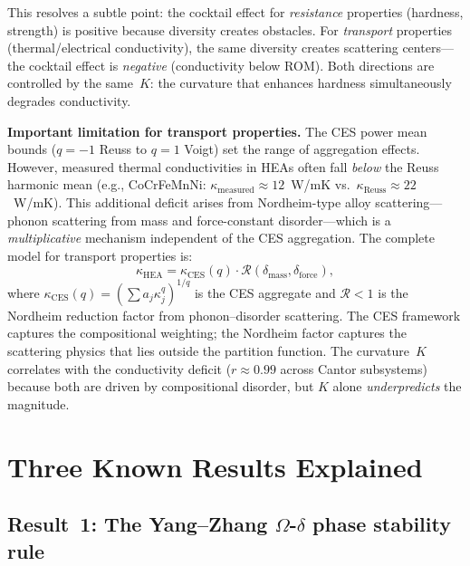 \documentclass[12pt,letterpaper]{article}
\theoremstyle{definition}
\begin{document}
This resolves a subtle point: the cocktail effect for \emph{resistance} properties (hardness, strength) is positive because diversity creates obstacles.  For \emph{transport} properties (thermal/electrical conductivity), the same diversity creates scattering centers---the cocktail effect is \emph{negative} (conductivity below ROM).  Both directions are controlled by the same~$K$: the curvature that enhances hardness simultaneously degrades conductivity.

\textbf{Important limitation for transport properties.}  The CES power mean bounds ($q = -1$ Reuss to $q = 1$ Voigt) set the range of aggregation effects.  However, measured thermal conductivities in HEAs often fall \emph{below} the Reuss harmonic mean (e.g., CoCrFeMnNi: $\kappa_{\mathrm{measured}} \approx 12$~W/mK vs.\ $\kappa_{\mathrm{Reuss}} \approx 22$~W/mK\@).  This additional deficit arises from Nordheim-type alloy scattering---phonon scattering from mass and force-constant disorder---which is a \emph{multiplicative} mechanism independent of the CES aggregation.  The complete model for transport properties is:
\begin{equation}\label{eq:kappa_layered}
  \kappa_{\mathrm{HEA}} = \kappa_{\mathrm{CES}}(q) \cdot \mathcal{R}(\delta_{\mathrm{mass}}, \delta_{\mathrm{force}}),
\end{equation}
where $\kappa_{\mathrm{CES}}(q) = (\sum a_j \kappa_j^q)^{1/q}$ is the CES aggregate and $\mathcal{R} < 1$ is the Nordheim reduction factor from phonon--disorder scattering.  The CES framework captures the compositional weighting; the Nordheim factor captures the scattering physics that lies outside the partition function.  The curvature~$K$ correlates with the conductivity deficit ($r \approx 0.99$ across Cantor subsystems) because both are driven by compositional disorder, but $K$ alone \emph{underpredicts} the magnitude.


\section{Three Known Results Explained}

\subsection{Result~1: The Yang--Zhang $\Omega$-$\delta$ phase stability rule}
\end{document}
